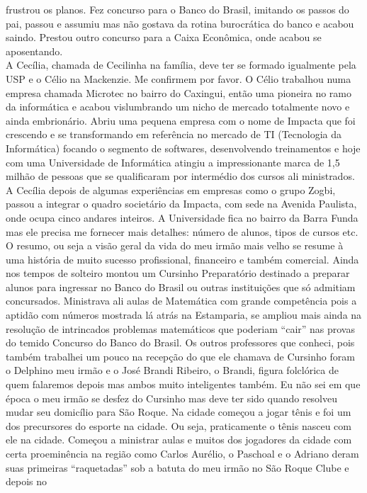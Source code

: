 \documentclass[12pt,brazil,]{book}
\begin{document}
frustrou os planos. Fez concurso para o Banco do Brasil, imitando os
passos do pai, passou e assumiu mas não gostava da rotina burocrática do
banco e acabou saindo. Prestou outro concurso para a Caixa Econômica,
onde acabou se aposentando.\\
A Cecília, chamada de Cecilinha na família, deve ter se formado
igualmente pela USP e o Célio na Mackenzie. Me confirmem por favor. O
Célio trabalhou numa empresa chamada Microtec no bairro do Caxingui,
então uma pioneira no ramo da informática e acabou vislumbrando um nicho
de mercado totalmente novo e ainda embrionário. Abriu uma pequena
empresa com o nome de Impacta que foi crescendo e se transformando em
referência no mercado de TI (Tecnologia da Informática) focando o
segmento de softwares, desenvolvendo treinamentos e hoje com uma
Universidade de Informática atingiu a impressionante marca de 1,5 milhão
de pessoas que se qualificaram por intermédio dos cursos ali
ministrados. A Cecília depois de algumas experiências em empresas como o
grupo Zogbi, passou a integrar o quadro societário da Impacta, com sede
na Avenida Paulista, onde ocupa cinco andares inteiros. A Universidade
fica no bairro da Barra Funda mas ele precisa me fornecer mais detalhes:
número de alunos, tipos de cursos etc.\\
O resumo, ou seja a visão geral da vida do meu irmão mais velho se
resume à uma história de muito sucesso profissional, financeiro e também
comercial. Ainda nos tempos de solteiro montou um Cursinho Preparatório
destinado a preparar alunos para ingressar no Banco do Brasil ou outras
instituições que só admitiam concursados. Ministrava ali aulas de
Matemática com grande competência pois a aptidão com números mostrada lá
atrás na Estamparia, se ampliou mais ainda na resolução de intrincados
problemas matemáticos que poderiam ``cair'' nas provas do temido
Concurso do Banco do Brasil. Os outros professores que conheci, pois
também trabalhei um pouco na recepção do que ele chamava de Cursinho
foram o Delphino meu irmão e o José Brandi Ribeiro, o Brandi, figura
folclórica de quem falaremos depois mas ambos muito inteligentes também.
Eu não sei em que época o meu irmão se desfez do Cursinho mas deve ter
sido quando resolveu mudar seu domicílio para São Roque. Na cidade
começou a jogar tênis e foi um dos precursores do esporte na cidade. Ou
seja, praticamente o tênis nasceu com ele na cidade. Começou a ministrar
aulas e muitos dos jogadores da cidade com certa proeminência na região
como Carlos Aurélio, o Paschoal e o Adriano deram suas primeiras
``raquetadas'' sob a batuta do meu irmão no São Roque Clube e depois no
\end{document}
